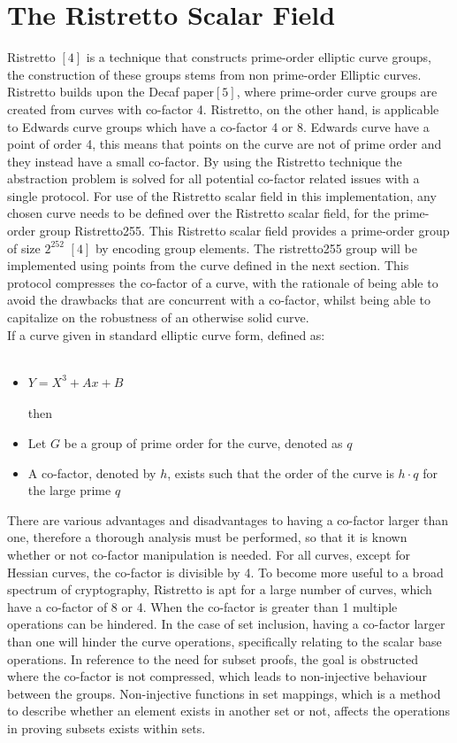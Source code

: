 \documentclass{article}
\begin{document}
\section{The Ristretto Scalar Field}
Ristretto $[4]$ is a technique that constructs prime-order elliptic curve groups, the construction of these groups stems from non prime-order Elliptic curves. Ristretto builds upon the Decaf paper$[5]$, where prime-order curve groups are created from curves with co-factor 4. Ristretto, on the other hand, is applicable to Edwards curve groups which have a co-factor 4 or 8. Edwards curve have a point of order 4, this means that points on the curve are not of prime order and they instead have a small co-factor. By using the Ristretto technique the abstraction problem is solved for all potential co-factor related issues with a single protocol. For use of the Ristretto scalar field in this implementation, any chosen curve needs to be defined over the Ristretto scalar field, for the prime-order group Ristretto255. This Ristretto scalar field provides a prime-order group of size $2^{252}$ $[4]$ by encoding group elements. The ristretto255 group will be implemented using points from the curve defined in the next section.  This protocol compresses the co-factor of a curve, with the rationale of being able to avoid the drawbacks that are concurrent with a co-factor, whilst being able to capitalize on the robustness of an otherwise solid curve.\\ If a curve given in standard elliptic curve form, defined as: \\\\
\begin{itemize} 
    \item $Y = X^3 + Ax + B$\\\\
    then\\
    \item Let $G$ be a group of prime order for the curve, denoted as $q$
    \item  A co-factor, denoted by $h$, exists such that the order of the curve is $h \cdot q$ for the large prime $q$ 
\end{itemize} 
\hfill \break
There are various advantages and disadvantages to having a co-factor larger than one, therefore a thorough analysis must be performed,  so that it is known whether or not co-factor manipulation is needed. For all curves, except for Hessian curves, the co-factor is divisible by 4. To become more useful to a broad spectrum of cryptography, Ristretto is apt for a large number of curves, which have a co-factor of 8 or 4. When the co-factor is greater than 1 multiple operations can be hindered. In the case of set inclusion, having a co-factor larger than one will hinder the curve operations, specifically relating to the scalar base operations. In reference to the need for subset proofs, the goal is obstructed where the co-factor is not compressed, which leads to non-injective behaviour between the groups. Non-injective functions in set mappings, which is a method to describe whether an element exists in another set or not, affects the operations in proving subsets exists within sets. \\\\
\end{document}
